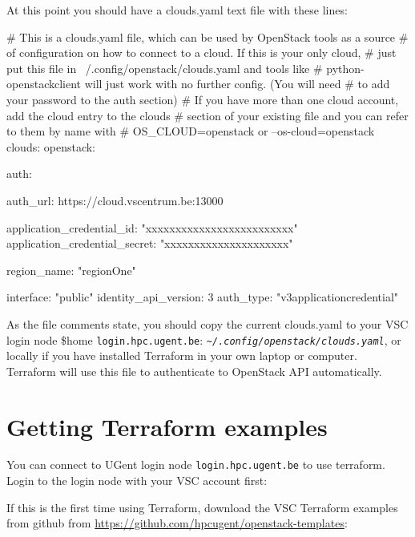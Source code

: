 At this point you should have a clouds.yaml text file with these lines:
\begin{code}{}
# This is a clouds.yaml file, which can be used by OpenStack tools as a source
# of configuration on how to connect to a cloud. If this is your only cloud,
# just put this file in ~/.config/openstack/clouds.yaml and tools like
# python-openstackclient will just work with no further config. (You will need
# to add your password to the auth section)
# If you have more than one cloud account, add the cloud entry to the clouds
# section of your existing file and you can refer to them by name with
# OS_CLOUD=openstack or --os-cloud=openstack
clouds:
  openstack:
    
    auth:
      
      auth_url: https://cloud.vscentrum.be:13000
      
      application_credential_id: "xxxxxxxxxxxxxxxxxxxxxxxxx"
      application_credential_secret: "xxxxxxxxxxxxxxxxxxxxx"
    
      
        
    region_name: "regionOne"
        
      
    interface: "public"
    identity_api_version: 3
    auth_type: "v3applicationcredential"
\end{code}

As the file comments state, you should copy the current clouds.yaml to your VSC login node \$home
\lstinline{login.hpc.ugent.be}: \texttt{\emph{\~\//.config/openstack/clouds.yaml}}, or locally
if you have installed \gls{Terraform} in your own laptop or computer.
\gls{Terraform} will use this file to authenticate to OpenStack API automatically.


\section{Getting Terraform examples}\label{sec:getting-terraform-templ}

You can connect to UGent login node \lstinline{login.hpc.ugent.be} to use terraform.
Login to the login node with your VSC account first:

\begin{prompt}
\end{prompt}

If this is the first time using Terraform, download the VSC Terraform examples from github from
\url{https://github.com/hpcugent/openstack-templates}:

